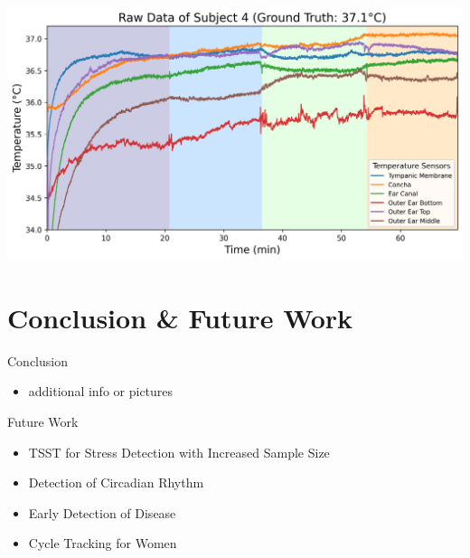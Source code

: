 \documentclass[en]{sdqbeamer}
\begin{document}
\begin{frame}
    \begin{center}
        \includegraphics[width=0.9\linewidth]{../thesis-doc/images/study2/p04/Logging_study2_p04_0smoothed_raw_data.png} 
    \end{center}
\end{frame}



\section{Conclusion \& Future Work}
\begin{frame}{Conclusion}
    \begin{itemize}
        \item additional info or pictures
    \end{itemize}
\end{frame}

\begin{frame}{Future Work}
    \begin{itemize}
        \item TSST for Stress Detection with Increased Sample Size
        \item Detection of Circadian Rhythm
        \item Early Detection of Disease
        \item Cycle Tracking for Women
    \end{itemize}
\end{frame}
\end{document}
